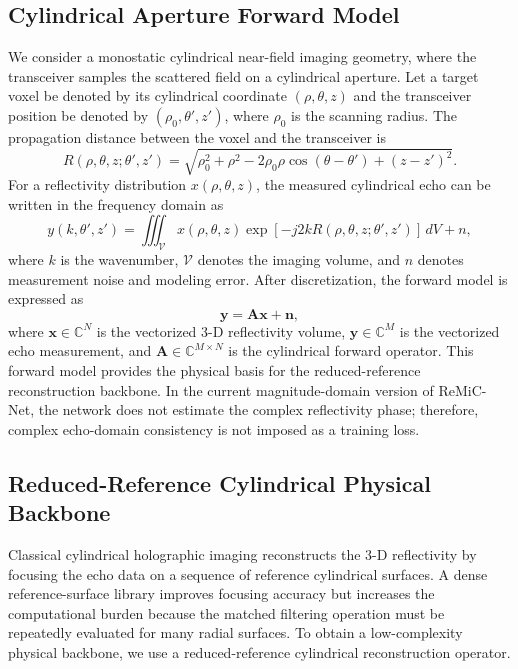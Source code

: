 \documentclass[journal]{IEEEtran}
\begin{document}
\subsection{Cylindrical Aperture Forward Model}
\label{subsec:reduced_reference_backbone}

We consider a monostatic cylindrical near-field imaging geometry, where the transceiver samples the scattered field on a cylindrical aperture. Let a target voxel be denoted by its cylindrical coordinate $(\rho,\theta,z)$ and the transceiver position be denoted by $(\rho_0,\theta',z')$, where $\rho_0$ is the scanning radius. The propagation distance between the voxel and the transceiver is
\begin{equation}
R(\rho,\theta,z;\theta',z')=
\sqrt{\rho_0^2+\rho^2-2\rho_0\rho\cos(\theta-\theta')+(z-z')^2}.
\label{eq:distance}
\end{equation}
For a reflectivity distribution $x(\rho,\theta,z)$, the measured cylindrical echo can be written in the frequency domain as
\begin{equation}
y(k,\theta',z') = \iiint_{\mathcal{V}} x(\rho,\theta,z)
\exp[-j2kR(\rho,\theta,z;\theta',z')]\,dV + n,
\label{eq:reduced_backbone_measurement}
\end{equation}
where $k$ is the wavenumber, $\mathcal{V}$ denotes the imaging volume, and $n$ denotes measurement noise and modeling error. After discretization, the forward model is expressed as
\begin{equation}
\mathbf{y}=\mathbf{A}\mathbf{x}+\mathbf{n},
\label{eq:reduced_backbone_discrete}
\end{equation}
where $\mathbf{x}\in\mathbb{C}^{N}$ is the vectorized 3-D reflectivity volume, $\mathbf{y}\in\mathbb{C}^{M}$ is the vectorized echo measurement, and $\mathbf{A}\in\mathbb{C}^{M\times N}$ is the cylindrical forward operator. This forward model provides the physical basis for the reduced-reference reconstruction backbone. In the current magnitude-domain version of ReMiC-Net, the network does not estimate the complex reflectivity phase; therefore, complex echo-domain consistency is not imposed as a training loss.

\subsection{Reduced-Reference Cylindrical Physical Backbone}
\label{subsec:physical_backbone}

Classical cylindrical holographic imaging reconstructs the 3-D reflectivity by focusing the echo data on a sequence of reference cylindrical surfaces. A dense reference-surface library improves focusing accuracy but increases the computational burden because the matched filtering operation must be repeatedly evaluated for many radial surfaces. To obtain a low-complexity physical backbone, we use a reduced-reference cylindrical reconstruction operator.
\end{document}
